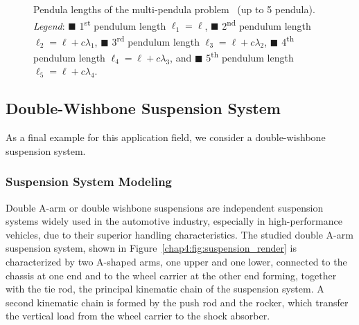 \begin{figure}[htb]
  \centering
  \small{}
  \caption{Pendula lengths of the multi-pendula problem~\cite{nedialkov2008solvingIII} (up to 5 pendula). \emph{Legend}: \textcolor{mycolor1}{$\blacksquare$} 1\textsuperscript{st} pendulum length $\ell_1 = \ell$, \textcolor{mycolor2}{$\blacksquare$} 2\textsuperscript{nd} pendulum length $\ell_2 = \ell + c\lambda_1$, \textcolor{mycolor3}{$\blacksquare$} 3\textsuperscript{rd} pendulum length $\ell_3 = \ell + c\lambda_2$, \textcolor{mycolor4}{$\blacksquare$} 4\textsuperscript{th} pendulum length $\ell_4 = \ell + c\lambda_3$, and \textcolor{mycolor5}{$\blacksquare$} 5\textsuperscript{th} pendulum length $\ell_5 = \ell + c\lambda_4$.}
  \label{chap4:fig:npendula_length}
\end{figure}

\subsection{Double-Wishbone Suspension System}

As a final example for this application field, we consider a double-wishbone suspension system.

\subsubsection{Suspension System Modeling}

Double A-arm or double wishbone suspensions are independent suspension systems widely used in the automotive industry, especially in high-performance vehicles, due to their superior handling characteristics. The studied double A-arm suspension system, shown in Figure~\ref{chap4:fig:suspension_render} is characterized by two A-shaped arms, one upper and one lower, connected to the chassis at one end and to the wheel carrier at the other end forming, together with the tie rod, the principal kinematic chain of the suspension system. A second kinematic chain is formed by the push rod and the rocker, which transfer the vertical load from the wheel carrier to the shock absorber.

